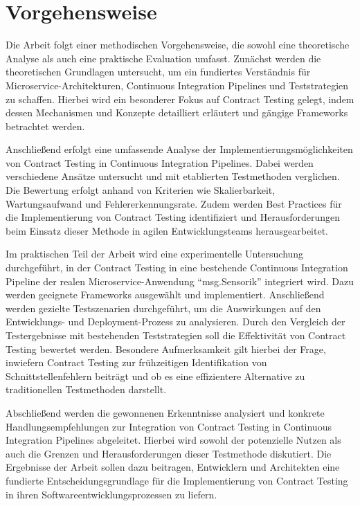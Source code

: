\chapter{Vorgehensweise}\label{ch:foundation}

Die Arbeit folgt einer methodischen Vorgehensweise, die sowohl eine theoretische Analyse als auch eine praktische Evaluation umfasst.
Zunächst werden die theoretischen Grundlagen untersucht, um ein fundiertes Verständnis für Microservice-Architekturen, Continuous Integration Pipelines und Teststrategien zu schaffen.
Hierbei wird ein besonderer Fokus auf Contract Testing gelegt, indem dessen Mechanismen und Konzepte detailliert erläutert und gängige Frameworks betrachtet werden.

Anschließend erfolgt eine umfassende Analyse der Implementierungsmöglichkeiten von Contract Testing in Continuous Integration Pipelines.
Dabei werden verschiedene Ansätze untersucht und mit etablierten Testmethoden verglichen.
Die Bewertung erfolgt anhand von Kriterien wie Skalierbarkeit, Wartungsaufwand und Fehlererkennungsrate.
Zudem werden Best Practices für die Implementierung von Contract Testing identifiziert und Herausforderungen beim Einsatz dieser Methode in agilen Entwicklungsteams herausgearbeitet.

Im praktischen Teil der Arbeit wird eine experimentelle Untersuchung durchgeführt, in der Contract Testing in eine
bestehende Continuous Integration Pipeline der realen Microservice-Anwendung \enquote{msg.Sensorik} integriert
wird.
Dazu werden geeignete Frameworks ausgewählt und implementiert.
Anschließend werden gezielte Testszenarien durchgeführt, um die Auswirkungen auf den Entwicklungs- und Deployment-Prozess zu analysieren.
Durch den Vergleich der Testergebnisse mit bestehenden Teststrategien soll die Effektivität von Contract Testing bewertet werden.
Besondere Aufmerksamkeit gilt hierbei der Frage, inwiefern Contract Testing zur frühzeitigen Identifikation von Schnittstellenfehlern beiträgt und ob es eine effizientere Alternative zu traditionellen Testmethoden darstellt.

Abschließend werden die gewonnenen Erkenntnisse analysiert und konkrete Handlungsempfehlungen zur Integration von Contract Testing in Continuous Integration Pipelines abgeleitet.
Hierbei wird sowohl der potenzielle Nutzen als auch die Grenzen und Herausforderungen dieser Testmethode diskutiert.
Die Ergebnisse der Arbeit sollen dazu beitragen, Entwicklern und Architekten eine fundierte Entscheidungsgrundlage für die Implementierung von Contract Testing in ihren Softwareentwicklungsprozessen zu liefern.
